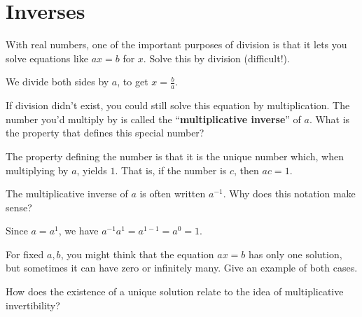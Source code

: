 \documentclass[../gatm_answers.tex]{subfiles}
\begin{document}
\section{Inverses}

\begin{outer_problem}[start=1]
\item
\end{outer_problem}

\begin{inner_problem}[start=1]
\item With real numbers, one of the important purposes of division is that it lets you solve equations like $ax=b$ for $x$. Solve this by division (difficult!).
\end{inner_problem}

We divide both sides by $a$, to get $x=\frac{b}{a}$.

\begin{inner_problem}
\item If division didn't exist, you could still solve this equation by multiplication. The number you'd multiply by is called the ``\textbf{multiplicative inverse}'' of $a$. What is the property that defines this special number?
\end{inner_problem}

The property defining the number is that it is the unique number which, when multiplying by $a$, yields $1$. That is, if the number is $c$, then $ac=1$.

\begin{inner_problem}
\item The multiplicative inverse of $a$ is often written $a^{-1}$. Why does this notation make sense?
\end{inner_problem}

Since $a=a^1$, we have $a^{-1}a^1=a^{1-1}=a^0=1$.

\begin{outer_problem}
\item
\end{outer_problem}

\begin{inner_problem}[start=1]
\item For fixed $a,b$, you might think that the equation $ax=b$ has only one solution, but sometimes it can have zero or infinitely many. Give an example of both cases.
\end{inner_problem}

\begin{inner_problem}
\item How does the existence of a unique solution relate to the idea of multiplicative invertibility?
\end{inner_problem}
\end{document}
